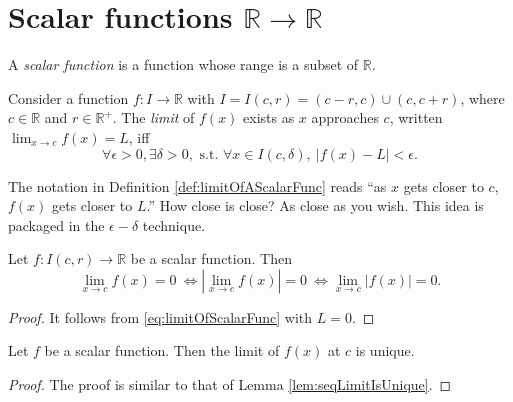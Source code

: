 \section{Scalar functions
  $\mathbb{R}\rightarrow\mathbb{R}$}
\label{sec:cont-funct-on-R}

\begin{defn}
  A \emph{scalar function} is a function
   whose range is a subset of $\mathbb{R}$.
\end{defn}

\begin{defn}
  \label{def:limitOfAScalarFunc}
  Consider a function $f: I\rightarrow \mathbb{R}$
  with $I=I(c,r)=(c-r,c)\cup (c,c+r)$, where $c\in \mathbb{R}$
  and $r\in \mathbb{R}^{+}$.
  The \emph{limit} of $f(x)$  exists
   as $x$ approaches $c$, written
     $\lim_{x\rightarrow c} f(x) = L$,
  iff 
  \begin{equation}
    \label{eq:limitOfScalarFunc}
 \forall \epsilon>0, \exists \delta>0, \text{ s.t. }
    \forall x\in I(c,\delta),\ |f(x)-L|<\epsilon.
  \end{equation}
\end{defn}

\begin{rem}
  The notation in Definition \ref{def:limitOfAScalarFunc}
  reads ``as $x$ gets closer to $c$,
 $f(x)$ gets closer to $L$.''
How close is close?
As close as you wish.
This idea is packaged in the $\epsilon-\delta$ technique.
\end{rem}

\begin{lem}
  \label{lem:funcCvTo0IsEqulvalentToAbsoluteFuncCvTo}
  Let $f:I(c,r)\rightarrow \mathbb{R}$ be a scalar function. Then
  \begin{displaymath}
    \lim_{x\rightarrow c}f(x)=0
    \ \Leftrightarrow \left| \lim_{x\rightarrow c}f(x) \right|=0
    \ \Leftrightarrow \lim_{x\rightarrow c} |f(x)|=0.
  \end{displaymath}
\end{lem}
\begin{proof}
  It follows from \eqref{eq:limitOfScalarFunc} with $L=0$.
\end{proof}

\begin{lem}
  \label{lem:funcLimitIsUnique}
  Let $f$ be a scalar function. Then the limit of $f(x)$ at $c$
  is unique.
\end{lem}
\begin{proof}
  The proof is similar to that of Lemma \ref{lem:seqLimitIsUnique}.
\end{proof}

